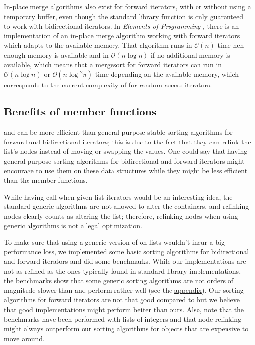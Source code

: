 \documentclass{isocpp_proposal}
\begin{document}
In-place merge algorithms also exist for forward iterators, with or without using a temporary buffer, even though the standard library function  is only guaranteed to work with bidirectional iterators. In \emph{Elements of Programming} \cite{EOP}, there is an implementation of an in-place merge algorithm working with forward iterators which adapts to the available memory. That algorithm runs in $\mathcal{O}(n)$ time hen enough memory is available and in $\mathcal{O}(n \log{} n)$ if no additional memory is available, which means that a mergesort for forward iterators can run in $\mathcal{O}(n \log{} n)$ or $\mathcal{O}(n \log{}^2 n)$ time depending on the available memory, which corresponds to the current complexity of  for random-access iterators.

\subsection{Benefits of  member functions}

 and  can be more efficient than general-purpose stable sorting algorithms for forward and bidirectional iterators; this is due to the fact that they can relink the list's nodes instead of moving or swapping the values. One could say that having general-purpose sorting algorithms for bidirectional and forward iterators might encourage to use them on these data structures while they might be less efficient than the member functions.

\vspace{0.3cm}

While having  call  when given list iterators would be an interesting idea, the standard generic algorithms are not allowed to alter the containers, and relinking nodes clearly counts as altering the list; therefore, relinking nodes when using generic algorithms is not a legal optimization.

\vspace{0.3cm}

To make sure that using a generic version of  on lists wouldn't incur a big performance loss, we implemented some basic sorting algorithms for bidirectional and forward iterators and did some benchmarks. While our implementations are not as refined as the ones typically found in standard library implementations, the benchmarks show that some generic sorting algorithms are not orders of magnitude slower than  and perform rather well (see the \hyperref[App:Benchmarks]{appendix}). Our sorting algorithms for forward iterators are not that good compared to  but we believe that good implementations might perform better than ours. Also, note that the benchmarks have been performed with lists of integers and that node relinking might always outperform our sorting algorithms for objects that are expensive to move around.
\end{document}
